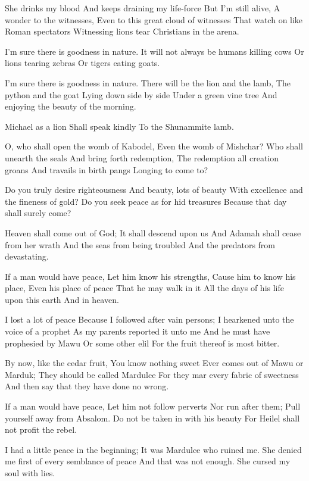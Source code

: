 \documentclass[
]{book}
\begin{document}
She drinks my blood
And keeps draining my life-force
But I'm still alive,
A wonder to the witnesses,
Even to this great cloud of witnesses
That watch on like Roman spectators
Witnessing lions tear Christians in the arena.

I'm sure there is goodness in nature.
It will not always be humans killing cows
Or lions tearing zebras
Or tigers eating goats.

I'm sure there is goodness in nature.
There will be the lion and the lamb,
The python and the goat
Lying down side by side
Under a green vine tree
And enjoying the beauty of the morning.

Michael as a lion
Shall speak kindly
To the Shunammite lamb.

O, who shall open the womb of Kabodel,
Even the womb of Mishchar?
Who shall unearth the seals
And bring forth redemption,
The redemption all creation groans
And travails in birth pangs
Longing to come to?

Do you truly desire righteousness
And beauty, lots of beauty
With excellence and the fineness of gold?
Do you seek peace as for hid treasures
Because that day shall surely come?

Heaven shall come out of God;
It shall descend upon us
And Adamah shall cease from her wrath
And the seas from being troubled
And the predators from devastating.

If a man would have peace,
Let him know his strengths,
Cause him to know his place,
Even his place of peace
That he may walk in it
All the days of his life upon this earth
And in heaven.

I lost a lot of peace
Because I followed after vain persons;
I hearkened unto the voice of a prophet
As my parents reported it unto me
And he must have prophesied by Mawu
Or some other elil
For the fruit thereof is most bitter.

By now, like the cedar fruit,
You know nothing sweet
Ever comes out of Mawu or Marduk;
They should be called Mardulce
For they mar every fabric of sweetness
And then say that they have done no wrong.

If a man would have peace,
Let him not follow perverts
Nor run after them;
Pull yourself away from Absalom.
Do not be taken in with his beauty
For Heilel shall not profit the rebel.

I had a little peace in the beginning;
It was Mardulce who ruined me.
She denied me first of every semblance of peace
And that was not enough.
She cursed my soul with lies.
\end{document}
